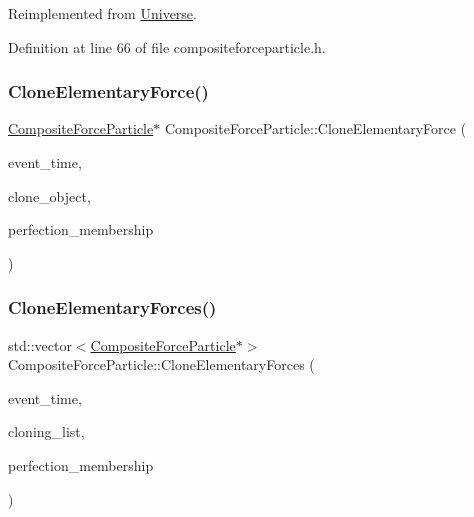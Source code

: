 Reimplemented from \mbox{\hyperlink{class_universe_a46a906baabb63e5d31f8b48ea1fae52e}{Universe}}.



Definition at line 66 of file compositeforceparticle.\+h.

\mbox{\label{class_composite_force_particle_a8163b425c10bd9cb9097d99e5d53d0a1}} 
\subsubsection{\texorpdfstring{Clone\+Elementary\+Force()}{CloneElementaryForce()}}
{\footnotesize\ttfamily \mbox{\hyperlink{class_composite_force_particle}{Composite\+Force\+Particle}}$\ast$ Composite\+Force\+Particle\+::\+Clone\+Elementary\+Force (\begin{DoxyParamCaption}\item[{std\+::chrono\+::time\+\_\+point$<$ \mbox{\hyperlink{universe_8h_a0ef8d951d1ca5ab3cfaf7ab4c7a6fd80}{Clock}} $>$}]{event\+\_\+time,  }\item[{\mbox{\hyperlink{class_composite_force_particle}{Composite\+Force\+Particle}} $\ast$}]{clone\+\_\+object,  }\item[{double}]{perfection\+\_\+membership }\end{DoxyParamCaption})}

\mbox{\label{class_composite_force_particle_a2e620a92eaca67dbb482a7fd8e248f7b}} 
\subsubsection{\texorpdfstring{Clone\+Elementary\+Forces()}{CloneElementaryForces()}}
{\footnotesize\ttfamily std\+::vector$<$\mbox{\hyperlink{class_composite_force_particle}{Composite\+Force\+Particle}}$\ast$$>$ Composite\+Force\+Particle\+::\+Clone\+Elementary\+Forces (\begin{DoxyParamCaption}\item[{std\+::chrono\+::time\+\_\+point$<$ \mbox{\hyperlink{universe_8h_a0ef8d951d1ca5ab3cfaf7ab4c7a6fd80}{Clock}} $>$}]{event\+\_\+time,  }\item[{std\+::vector$<$ \mbox{\hyperlink{class_composite_force_particle}{Composite\+Force\+Particle}} $\ast$$>$}]{cloning\+\_\+list,  }\item[{double}]{perfection\+\_\+membership }\end{DoxyParamCaption})}

